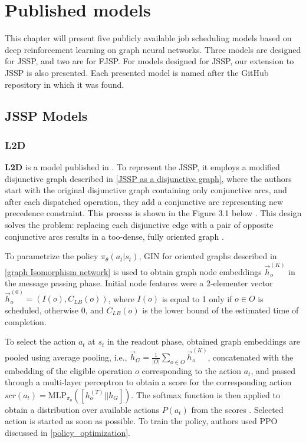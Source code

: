 \chapter{Published models}

This chapter will present five publicly available job scheduling models based on deep reinforcement learning on graph neural networks. Three models are designed for JSSP, and two are for FJSP. For models designed for JSSP, our extension to JSSP is also presented. Each presented model is named after the GitHub repository in which it was found. 

\section{JSSP Models}

\subsection{L2D}
\textbf{L2D} is a model published in \cite{zhang2020learning}. To represent the JSSP, it employs a modified disjunctive graph described in \ref{JSSP as a disjunctive graph}, where the authors start with the original disjunctive graph containing only conjunctive arcs, and after each dispatched operation, they add a conjunctive arc representing new precedence constraint. This process is shown in the Figure 3.1 below \cite{zhang2020learning}. This design solves the problem: replacing each disjunctive edge with a pair of opposite conjunctive arcs results in a too-dense, fully oriented graph \cite{zhang2020learning}.
\par
To parametrize the policy $\pi_\theta(a_t|s_t)$, GIN for oriented graphs described in \ref{graph Isomorphism network} is used to obtain graph node embeddings $\vec{h}_o^{(K)}$ in the message passing phase. Initial node features were a 2-elementer vector $\vec{h}_o^{(0)} = (I(o), C_{LB}(o))$, where $I(o)$ is equal to 1 only if $o \in O$ is scheduled, otherwise 0, and $C_{LB}(o)$ is the lower bound of the estimated time of completion. 
\par
To select the action $a_t$ at $s_t$ in the readout phase, obtained graph embeddings are pooled using average pooling, i.e., $\vec{h}_G = \frac{1}{|O|} \sum_{o \in O} \vec{h}_o^{(K)}$, concatenated with the embedding of the eligible operation $o$ corresponding to the action $a_t$, and passed through a multi-layer perceptron to obtain a score for the corresponding action $scr(a_t) = \text{MLP}_{\pi_\theta}\left ( \left [h_o^{(T)} || h_G \right ] \right )$. The softmax function is then applied to obtain a distribution over available actions $P(a_t)$ from the scores \cite{zhang2020learning}. Selected action is started as soon as possible. To train the policy, authors used PPO discussed in \ref{policy_optimization}.
